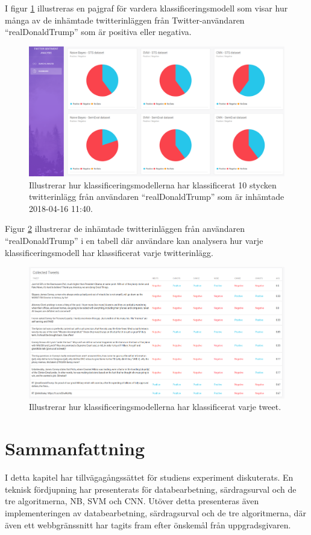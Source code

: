 \documentclass{kaumasters} %
\begin{document}
I figur \ref{fig:gui_search_g} illustreras en pajgraf för vardera klassificeringsmodell som visar hur många av de inhämtade twitterinläggen från Twitter-användaren “realDonaldTrump” som är positiva eller negativa.

\begin{figure}[H]
\includegraphics[width=12cm]{GUI_search_graph}
\centering
\caption{Illustrerar hur klassificeringsmodellerna har klassificerat 10 stycken twitterinlägg från användaren “realDonaldTrump” som är inhämtade 2018-04-16 11:40.}
\label{fig:gui_search_g}
\end{figure}

Figur \ref{fig:gui_search_t} illustrerar de inhämtade twitterinläggen från användaren “realDonaldTrump” i en tabell där användare kan analysera hur varje klassificeringsmodell har klassificerat varje twitterinlägg.

\begin{figure}[H]
\includegraphics[width=12cm]{GUI_search_table}
\centering
\caption{Illustrerar hur klassificeringsmodellerna har klassificerat varje tweet.}
\label{fig:gui_search_t}
\end{figure}
\section{Sammanfattning}
I detta kapitel har tillvägagångssättet för studiens experiment diskuterats. En teknisk fördjupning har presenterats för databearbetning, särdragsurval och de tre algoritmerna, NB, SVM och CNN. Utöver detta presenteras även implementeringen av databearbetning, särdragsurval och de tre algoritmerna, där även ett webbgränssnitt har tagits fram efter önskemål från uppgradsgivaren.
\end{document}

